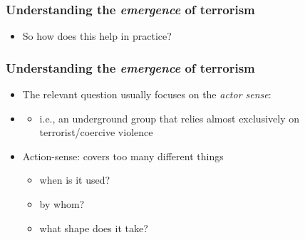 \documentclass[aspectratio=43]{beamer}
\begin{document}
\begin{frame}
\frametitle{Understanding the \textit{emergence} of terrorism}
\centering

\begin{itemize}
  \item So how does this help in practice?
\end{itemize}


\end{frame}

\begin{frame}
\frametitle{Understanding the \textit{emergence} of terrorism}
\centering

\begin{itemize}
  \item The relevant question usually focuses on the \textit{actor sense}:
  \item[] {\color{red}{when does a domestic terrorist group emerge?}}
  \begin{itemize}
    \item i.e., an underground group that relies almost exclusively on terrorist/coercive violence
  \end{itemize}
  \item<2-> Action-sense: covers too many different things
  \begin{itemize}
    \item when is it used?
    \item by whom?
    \item what shape does it take?
  \end{itemize}
\end{itemize}


\end{frame}
\end{document}
